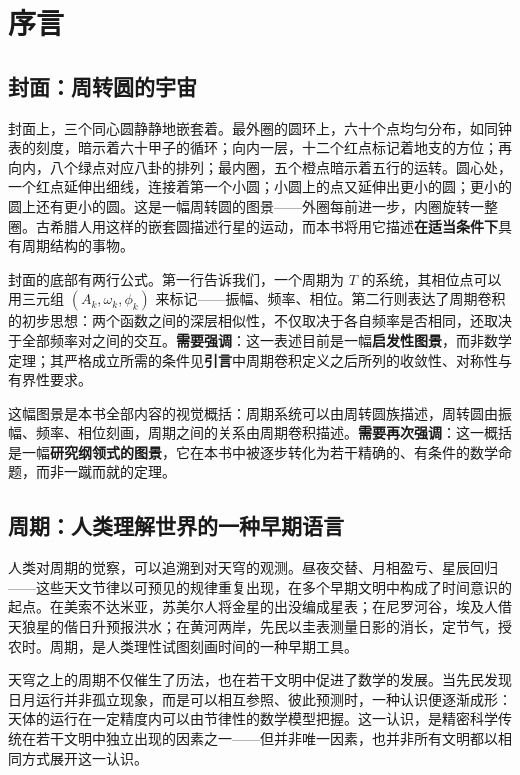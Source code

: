 \chapter*{序言}

\section*{封面：周转圆的宇宙}

封面上，三个同心圆静静地嵌套着。最外圈的圆环上，六十个点均匀分布，如同钟表的刻度，暗示着六十甲子的循环；向内一层，十二个红点标记着地支的方位；再向内，八个绿点对应八卦的排列；最内圈，五个橙点暗示着五行的运转。圆心处，一个红点延伸出细线，连接着第一个小圆；小圆上的点又延伸出更小的圆；更小的圆上还有更小的圆。这是一幅周转圆的图景——外圈每前进一步，内圈旋转一整圈。古希腊人用这样的嵌套圆描述行星的运动，而本书将用它描述\textbf{在适当条件下}具有周期结构的事物。

封面的底部有两行公式。第一行告诉我们，一个周期为 $T$ 的系统，其相位点可以用三元组 $(A_k, \omega_k, \phi_k)$ 来标记——振幅、频率、相位。第二行则表达了周期卷积的初步思想：两个函数之间的深层相似性，不仅取决于各自频率是否相同，还取决于全部频率对之间的交互。\textbf{需要强调}：这一表述目前是一幅\textbf{启发性图景}，而非数学定理；其严格成立所需的条件见\textbf{引言}中周期卷积定义之后所列的收敛性、对称性与有界性要求。

这幅图景是本书全部内容的视觉概括：周期系统可以由周转圆族描述，周转圆由振幅、频率、相位刻画，周期之间的关系由周期卷积描述。\textbf{需要再次强调}：这一概括是一幅\textbf{研究纲领式的图景}，它在本书中被逐步转化为若干精确的、有条件的数学命题，而非一蹴而就的定理。

\section*{周期：人类理解世界的一种早期语言}

人类对周期的觉察，可以追溯到对天穹的观测。昼夜交替、月相盈亏、星辰回归——这些天文节律以可预见的规律重复出现，在多个早期文明中构成了时间意识的起点。在美索不达米亚，苏美尔人将金星的出没编成星表；在尼罗河谷，埃及人借天狼星的偕日升预报洪水；在黄河两岸，先民以圭表测量日影的消长，定节气，授农时。周期，是人类理性试图刻画时间的一种早期工具。

天穹之上的周期不仅催生了历法，也在若干文明中促进了数学的发展。当先民发现日月运行并非孤立现象，而是可以相互参照、彼此预测时，一种认识便逐渐成形：天体的运行在一定精度内可以由节律性的数学模型把握。这一认识，是精密科学传统在若干文明中独立出现的因素之一——但并非唯一因素，也并非所有文明都以相同方式展开这一认识。

